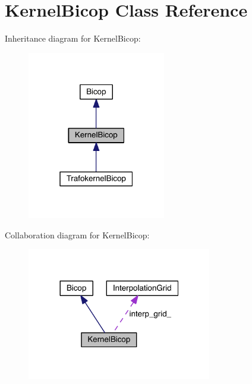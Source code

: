 \hypertarget{class_kernel_bicop}{}\section{Kernel\+Bicop Class Reference}
\label{class_kernel_bicop}


Inheritance diagram for Kernel\+Bicop\+:
\nopagebreak
\begin{figure}[H]
\begin{center}
\leavevmode
\includegraphics[width=171pt]{class_kernel_bicop__inherit__graph}
\end{center}
\end{figure}


Collaboration diagram for Kernel\+Bicop\+:
\nopagebreak
\begin{figure}[H]
\begin{center}
\leavevmode
\includegraphics[width=228pt]{class_kernel_bicop__coll__graph}
\end{center}
\end{figure}
